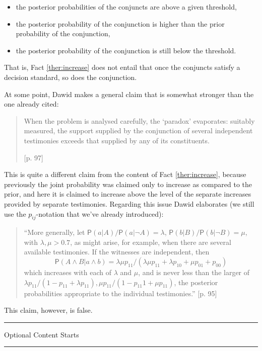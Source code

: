 \documentclass[10pt,dvipsnames,enabledeprecatedfontcommands]{scrartcl}
\newcommand{\n}{\neg}
\newcommand{\et}{\wedge}
\newcommand{\pr}[1]{\mathsf{P}(#1)}
\newcommand{\intermezzoa}{
	\begin{minipage}[c]{13cm}
	\begin{center}\rule{10cm}{0.4pt}



	\tiny{\sc Optional Content Starts}
	
	\vspace{-1mm}
	
	\rule{10cm}{0.4pt}\end{center}
	\end{minipage}\nopagebreak 
	}
\begin{document}
\begin{itemize}
\item  the posterior probabilities of the conjuncts are above a given threshold,
\item   the posterior probability of the conjunction is higher than the prior probability of the conjunction,
\item   the posterior probability of the conjunction 
 is still below the threshold.
\end{itemize}

That is, Fact \ref{ther:increase} does not entail that once the
conjuncts satisfy a decision standard, so does the conjunction.

At some point, Dawid makes a general claim that is somewhat stronger
than the one already cited:

\begin{quote} When the problem is analysed carefully, the `paradox' evaporates: suitably measured, the support supplied by the conjunction of several independent testimonies exceeds that supplied by any of its constituents.

  [p. 97]\end{quote}

This is quite a different claim from the content of Fact
\ref{ther:increase}, because previously the joint probability was
claimed only to increase as compared to the prior, and here it is
claimed to increase above the level of the separate increases provided
by separate testimonies. Regarding this issue Dawid elaborates (we still
use the \(p_{ij}\)-notation that we've already introduced):

\begin{quote}
 ``More generally, let $\pr{a\vert A}/\pr{a\vert \n A}=\lambda$, $\pr{b\vert B}/\pr{b\vert \n B}=\mu$, with $\lambda, \mu >0.7$, as might arise, for example, when there are several available testimonies. If the witnesses are
  independent, then \[\pr{A\et B\vert  a\et b} = \lambda \mu p_{11}/(\lambda \mu p_{11} + \lambda p_{10} +\mu p_{01} + p_{00})\] which  increases with
 each of $\lambda$ and $\mu$, and is never less than the larger of $\lambda p_{11}/(1-p_{11}+\lambda p_{11}),
 \mu p_{11} /(1- p_{11} 1 + \mu p_{11})$, the posterior probabilities appropriate to the individual testimonies.'' [p. 95]
 \end{quote}

This claim, however, is false.

\intermezzoa
\end{document}
